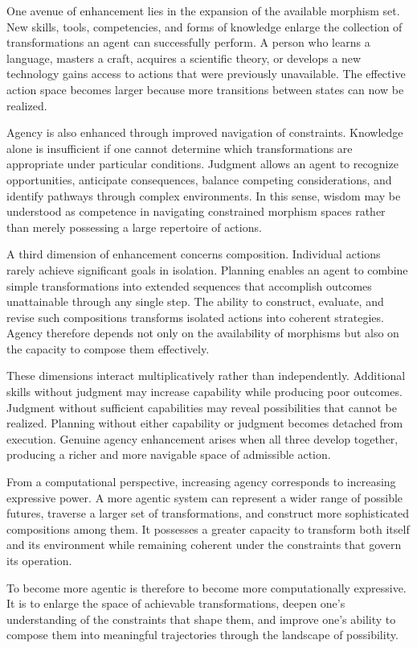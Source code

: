 \documentclass[12pt,letterpaper]{article}
\theoremstyle{remark}
\begin{document}
One avenue of enhancement lies in the expansion of the available morphism set. New skills, tools, competencies, and forms of knowledge enlarge the collection of transformations an agent can successfully perform. A person who learns a language, masters a craft, acquires a scientific theory, or develops a new technology gains access to actions that were previously unavailable. The effective action space becomes larger because more transitions between states can now be realized.

Agency is also enhanced through improved navigation of constraints. Knowledge alone is insufficient if one cannot determine which transformations are appropriate under particular conditions. Judgment allows an agent to recognize opportunities, anticipate consequences, balance competing considerations, and identify pathways through complex environments. In this sense, wisdom may be understood as competence in navigating constrained morphism spaces rather than merely possessing a large repertoire of actions.

A third dimension of enhancement concerns composition. Individual actions rarely achieve significant goals in isolation. Planning enables an agent to combine simple transformations into extended sequences that accomplish outcomes unattainable through any single step. The ability to construct, evaluate, and revise such compositions transforms isolated actions into coherent strategies. Agency therefore depends not only on the availability of morphisms but also on the capacity to compose them effectively.

These dimensions interact multiplicatively rather than independently. Additional skills without judgment may increase capability while producing poor outcomes. Judgment without sufficient capabilities may reveal possibilities that cannot be realized. Planning without either capability or judgment becomes detached from execution. Genuine agency enhancement arises when all three develop together, producing a richer and more navigable space of admissible action.

From a computational perspective, increasing agency corresponds to increasing expressive power. A more agentic system can represent a wider range of possible futures, traverse a larger set of transformations, and construct more sophisticated compositions among them. It possesses a greater capacity to transform both itself and its environment while remaining coherent under the constraints that govern its operation.

To become more agentic is therefore to become more computationally expressive. It is to enlarge the space of achievable transformations, deepen one's understanding of the constraints that shape them, and improve one's ability to compose them into meaningful trajectories through the landscape of possibility.
\end{document}
